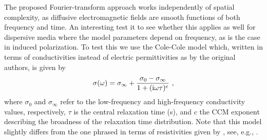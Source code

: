 \documentclass[extra, camera,%
]{gji}
\begin{document}
The proposed Fourier-transform approach works independently of spatial
complexity, as diffusive electromagnetic fields are smooth functions of both
frequency and time. An interesting test it to see whether this applies as well
for dispersive media where the model parameters depend on frequency, as is the
case in induced polarization. To test this we use the Cole-Cole model
\citep[CCM, ][]{JCP.41.Cole} which, written in terms of conductivities instead
of electric permittivities as by the original authors, is given by
%
\begin{equation}
  \sigma(\omega) = \sigma_\infty + \frac{\sigma_0 - \sigma_\infty}{1 +
    (\rm{i}\omega\tau)^c}\ ,
  \label{eq:ccm}
\end{equation}
%
where $\sigma_0$ and $\sigma_\infty$ refer to the low-frequency and
high-frequency conductivity values, respectively, $\tau$ is the central
relaxation time (s), and $c$ the CCM exponent describing the broadness of the
relaxation time distribution. Note that this model slightly differs from the
one phrased in terms of resistivities given by \cite{GEO.78.Pelton}, see, e.g.,
\cite{GJI.13.Tarasov}.
\end{document}
